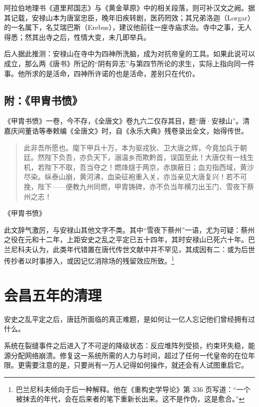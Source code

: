 阿拉伯地理书《道里邦国志》与《黄金草原》中的相关段落，则可补汉文之阙。据其记载，安禄山本为唐室忠臣，晚年旧疾转剧，医药罔效；其兄弟洛迦（Lorgar）的一名属下，名艾瑞巴斯（Erebus），建议他前往一座寺庙求治。寺中之事，无人得悉；然其出寺之后，性情大变，未几即举兵。

后人据此推测：安禄山在寺中为四神所洗脑，成为对抗帝皇的工具。如果此说可以成立，那么两《唐书》所记的“阴有异志”与第四节所论的求生，实际上指向同一件事。他所求的是活命，四神所许诺的也是活命，差别只在代价。

\subsection*{附：《甲胄书愤》}

《甲胄书愤》一卷，今不存，《全唐文》卷九六二仅存其目，题“唐·安禄山”。清嘉庆间董诰等奉敕编《全唐文》时，自《永乐大典》残卷录出全文，始得传世。

\vspace{2mm}
\begin{quote}
\small
此非吾所愿也。麾下甲兵十万，本为驱戎狄、卫大唐之辉，今竟加兵于朝廷。然陛下负吾，亦负天下，溺温乡而欺黔首，误国至此！大唐仅有一线生机，若陛下不取，吾当夺之！燃烽燧于两京，赤旗蔽日；血刃指西域，黄沙尽染。纵泰山崩，黄河沸，血染征袍重入关，亦当亲见大唐复兴！若不可挽，陛下——便教九州同燃，甲胄铸碑，亦不负当年横刀出玉门、雪夜下蔡州之志！
\end{quote}
\vspace{-4mm}
\begin{flushright}
{\small 《甲胄书愤》}
\end{flushright}
\vspace{2mm}

此文辞气激厉，与安禄山其他文字不类。其中“雪夜下蔡州”一语，尤为可疑：蔡州之役在元和十二年，上距安史之乱之平定已五十四年，其时安禄山已死六十年。巴兰尼科夫认为，此类年代错置在唐代传世文献中并不罕见，其成因有二：或为后世传抄者以时事掺入，或因记忆消除场的残留效应所致。\footnote{巴兰尼科夫倾向于后一种解释。他在《重构史学导论》第 336 页写道：“一个被抹去的年代，会在后来者的笔下重新长出来。这不是作伪，这是愈合。”}

\section{会昌五年的清理}

安史之乱平定之后，唐廷所面临的真正难题，是如何让一亿人忘记他们曾经拥有过什么。

系统在裂缝事件之后进入了不可逆的降级状态：反应堆阵列受损，约束环失稳，能源分配网络崩溃。修复这一系统所需的人力与时间，超过了任何一代皇帝的在位年限。更需要注意的是，只要尚有一万人记得如何操作，就还会有人试图重启它。

